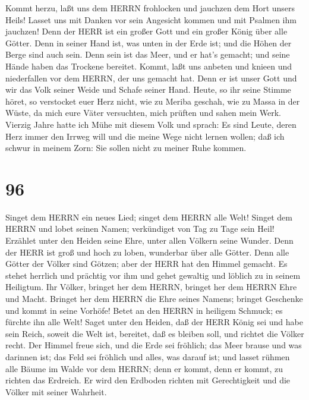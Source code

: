  Kommt herzu, laßt uns dem HERRN frohlocken und jauchzen dem
Hort unsers Heils!  Lasset uns mit Danken vor sein Angesicht
kommen und mit Psalmen ihm jauchzen!  Denn der HERR ist ein
großer Gott und ein großer König über alle Götter.  Denn in
seiner Hand ist, was unten in der Erde ist; und die Höhen der Berge sind
auch sein.  Denn sein ist das Meer, und er hat's gemacht;
und seine Hände haben das Trockene bereitet.  Kommt, laßt
uns anbeten und knieen und niederfallen vor dem HERRN, der uns gemacht
hat.  Denn er ist unser Gott und wir das Volk seiner Weide
und Schafe seiner Hand. Heute, so ihr seine Stimme höret, 
so verstocket euer Herz nicht, wie zu Meriba geschah, wie zu Massa in
der Wüste,  da mich eure Väter versuchten, mich prüften und
sahen mein Werk.  Vierzig Jahre hatte ich Mühe mit diesem
Volk und sprach: Es sind Leute, deren Herz immer den Irrweg will und die
meine Wege nicht lernen wollen;  daß ich schwur in meinem
Zorn: Sie sollen nicht zu meiner Ruhe kommen.

\hypertarget{section-95}{%
\section{96}\label{section-95}}

 Singet dem HERRN ein neues Lied; singet dem HERRN alle
Welt!  Singet dem HERRN und lobet seinen Namen; verkündiget
von Tag zu Tage sein Heil!  Erzählet unter den Heiden seine
Ehre, unter allen Völkern seine Wunder.  Denn der HERR ist
groß und hoch zu loben, wunderbar über alle Götter.  Denn
alle Götter der Völker sind Götzen; aber der HERR hat den Himmel
gemacht.  Es stehet herrlich und prächtig vor ihm und gehet
gewaltig und löblich zu in seinem Heiligtum.  Ihr Völker,
bringet her dem HERRN, bringet her dem HERRN Ehre und Macht.
 Bringet her dem HERRN die Ehre seines Namens; bringet
Geschenke und kommt in seine Vorhöfe!  Betet an den HERRN in
heiligem Schmuck; es fürchte ihn alle Welt!  Saget unter
den Heiden, daß der HERR König sei und habe sein Reich, soweit die Welt
ist, bereitet, daß es bleiben soll, und richtet die Völker recht.
 Der Himmel freue sich, und die Erde sei fröhlich; das Meer
brause und was darinnen ist;  das Feld sei fröhlich und
alles, was darauf ist; und lasset rühmen alle Bäume im Walde
 vor dem HERRN; denn er kommt, denn er kommt, zu richten
das Erdreich. Er wird den Erdboden richten mit Gerechtigkeit und die
Völker mit seiner Wahrheit.

